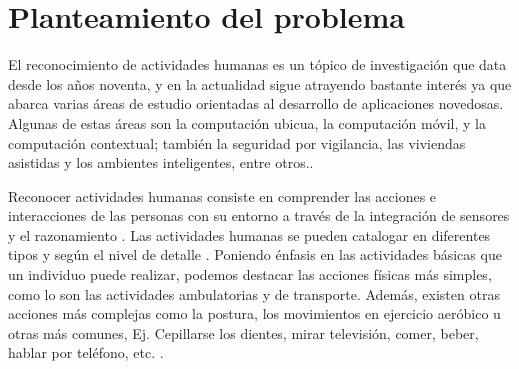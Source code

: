 \section{Planteamiento del problema}

\label{sec11:planteamiento}El reconocimiento de actividades humanas
es un tópico de investigación que data desde los años noventa, y en
la actualidad sigue atrayendo bastante interés ya que abarca varias
áreas de estudio orientadas al desarrollo de aplicaciones novedosas.
Algunas de estas áreas son la computación ubicua, la computación móvil,
y la computación contextual; también la seguridad por vigilancia,
las viviendas asistidas y los ambientes inteligentes, entre otros.\cite{Chen2012}. 

Reconocer actividades humanas consiste en comprender las acciones
e interacciones de las personas con su entorno a través de la integración
de sensores y el razonamiento \cite{ReyesOrtiz2015}. Las actividades
humanas se pueden catalogar en diferentes tipos y según el nivel de
detalle \cite{Chen2012}. Poniendo énfasis en las actividades básicas
que un individuo puede realizar, podemos destacar las acciones físicas
más simples, como lo son las actividades ambulatorias y de transporte.
Además, existen otras acciones más complejas como la postura, los
movimientos en ejercicio aeróbico u otras más comunes, Ej. Cepillarse
los dientes, mirar televisión, comer, beber, hablar por teléfono,
etc. \cite{LaraLabrador2013}.

